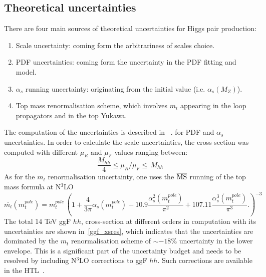\subsection{Theoretical uncertainties}
There are four main sources of theoretical uncertainties for Higgs pair production:
\begin{enumerate}
	\item Scale uncertainty: coming form the arbitrariness of scales choice.
	\item PDF uncertainties: coming form the uncertainty in the PDF fitting and model.
	\item $\alpha_s$ running uncertainty: originating from the initial value (i.e. $\alpha_s(M_Z) $).
	\item Top mass renormalisation scheme, which involves $m_t$ appearing in the loop propagators and in the top Yukawa.
\end{enumerate}
The computation of the uncertainties is described in ~\cite{Martin:2009bu, Demartin:2010er}. for PDF and $\alpha_s$ uncertainties.
In order to calculate the scale uncertainties, the cross-section was computed with different $ \mu_R$ and $\mu_F$ values ranging between:
\begin{equation}
	\frac{M_{hh}}{4} \leq \mu_R/\mu_F  \leq \,M_{hh}
\end{equation}
As for the $m_t$ renormalisation uncertainty, one uses the $\overline{\mathrm{MS}}$ running of the top mass formula at N$^3$LO~\cite{Baglio:2020wgt}
\begin{equation}
	\overline{m_t} (m_t^{pole}) =m_t^{pole}\, \left( 1+\frac{4}{3 \pi} \alpha_s(m_t^{pole})+10.9 \frac{\alpha^2_s(m_t^{pole})}{\pi^2} +107.11 \frac{\alpha^3_s(m_t^{pole})}{\pi^3}. \right) ^{-3} 
\end{equation}
The total 14 TeV ggF $hh$, cross-section at different orders in computation with its uncertainties are shown in~\autoref{ggf_xsres}, which indicates that the uncertainties are dominated by the $m_t$ renormalisation scheme of $\sim -18\%$ uncertainty in the lower envelope.  This is a significant part of the uncertainty budget and needs to be resolved by including N$^3$LO corrections to ggF $hh$. Such corrections are available in the  HTL~\cite{Chen:2019lzz,Chen:2019fhs}. 
%
